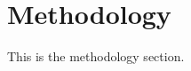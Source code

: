 \documentclass{article}
\begin{document}
\section{Methodology}

This is the methodology section.
\end{document}
